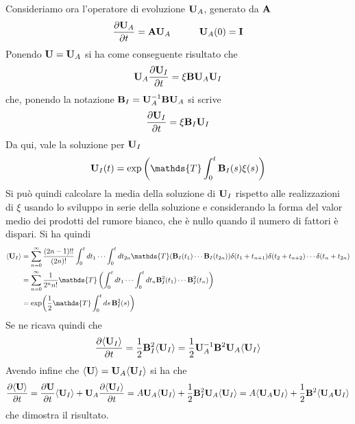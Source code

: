 \documentclass[10pt,a4paper]{article}
\begin{document}
Consideriamo ora l'operatore di evoluzione \(\vb{U}_{A}\), generato da \(\vb{A}\)
\begin{equation}
	\pdv{\vb{U}_A}{t} = \vb{A}\vb{U}_A \quad\quad\quad \vb{U}_A(0) = \vb{I}
\end{equation}
Ponendo \(\vb{U} = \vb{U}_A\) si ha come conseguente risultato che
\begin{equation}
	\vb{U}_{A} \pdv{\vb{U}_I}{t} = \xi \vb{B}\vb{U}_A \vb{U}_I
\end{equation}
che, ponendo la notazione \(\vb{B}_I = \vb{U}_A^{-1} \vb{B}\vb{U}_A\) si scrive
\begin{equation}
	\pdv{\vb{U}_I}{t} = \xi \vb{B}_I \vb{U}_I
\end{equation}
Da qui, vale la soluzione per \(\vb{U}_I\)
\begin{equation}
	\vb{U}_I(t) = \exp\left(\mathds{T}\int_0^t \vb{B}_I(s)\xi(s)\right)
\end{equation}
Si può quindi calcolare la media della soluzione di \(\vb{U}_I\) rispetto alle realizzazioni di \(\xi \) usando lo sviluppo in serie della soluzione e considerando la forma del valor medio dei prodotti del rumore bianco, che è nullo quando il numero di fattori è dispari. Si ha quindi
\begin{align}
	\langle\vb{U}_I\rangle &= \sum_{n=0}^\infty \frac{(2n-1)!!}{(2n)!}\int_0^t dt_1 \cdots \int_0^t dt_{2n} \mathds{T}(\vb{B}_I(t_1)\cdots\vb{B}_I(t_{2n})) \delta(t_1 + t_{n+1})\delta(t_2 + t_{n+2})\cdots\delta(t_n + t_{2n}) \\
	&= \sum_{n=0}^\infty \frac{1}{2^n n!} \mathds{T}\left(\int_0^t dt_1 \cdots \int_0^t dt_n \vb{B}_I^2(t_1)\cdots\vb{B}_I^2(t_n)\right) \\
	&= \exp(\frac{1}{2}\mathds{T}\int_0^t ds\, \vb{B}_I^2(s))
\end{align}
Se ne ricava quindi che
\begin{equation}
	\pdv{\langle\vb{U}_I\rangle}{t} = \frac{1}{2} \vb{B}_I^2\langle\vb{U}_I\rangle = \frac{1}{2} \vb{U}_A^{-1}\vb{B}^2\vb{U}_A\langle\vb{U}_I\rangle
\end{equation}
Avendo infine che \(\langle\vb{U}\rangle = \vb{U}_A\langle\vb{U}_I\rangle \) si ha che
\begin{equation}
	\pdv{\langle \vb{U}\rangle}{t} = \pdv{\vb{U}}{t}\langle\vb{U}_I\rangle + \vb{U}_A \pdv{\langle\vb{U}_I\rangle}{t} = A\vb{U}_A\langle\vb{U}_I\rangle + \frac{1}{2} \vb{B}^2_I\vb{U}_A\langle\vb{U}_I\rangle = A\langle\vb{U}_A\vb{U}_I\rangle + \frac{1}{2}\vb{B}^2\langle\vb{U}_A\vb{U}_I\rangle
\end{equation}
che dimostra il risultato.
\end{document}
